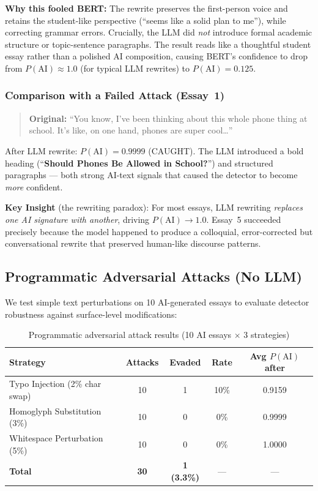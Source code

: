 \documentclass[11pt,a4paper]{article}
\begin{document}
\textbf{Why this fooled BERT:} The rewrite preserves the first-person voice and retains the student-like perspective (``seems like a solid plan to me''), while correcting grammar errors. Crucially, the LLM did \emph{not} introduce formal academic structure or topic-sentence paragraphs. The result reads like a thoughtful student essay rather than a polished AI composition, causing BERT's confidence to drop from $P(\text{AI})\approx1.0$ (for typical LLM rewrites) to $P(\text{AI})=0.125$.

\subsubsection*{Comparison with a Failed Attack (Essay~1)}

\begin{quote}
\textbf{Original:} ``You know, I've been thinking about this whole phone thing at school. It's like, on one hand, phones are super cool\ldots''
\end{quote}

After LLM rewrite: $P(\text{AI})=0.9999$ (CAUGHT). The LLM introduced a bold heading (``\textbf{Should Phones Be Allowed in School?}'') and structured paragraphs — both strong AI-text signals that caused the detector to become \emph{more} confident.

\textbf{Key Insight} (the rewriting paradox): For most essays, LLM rewriting \emph{replaces one AI signature with another}, driving $P(\text{AI})\to1.0$. Essay~5 succeeded precisely because the model happened to produce a colloquial, error-corrected but conversational rewrite that preserved human-like discourse patterns.

\subsection{Programmatic Adversarial Attacks (No LLM)}

We test simple text perturbations on 10 AI-generated essays to evaluate detector robustness against surface-level modifications:

\begin{table}[H]
\centering
\caption{Programmatic adversarial attack results (10 AI essays $\times$ 3 strategies)}
\label{tab:programmatic}
\begin{tabular}{lcccc}
\toprule
\textbf{Strategy} & \textbf{Attacks} & \textbf{Evaded} & \textbf{Rate} & \textbf{Avg $P(\text{AI})$ after} \\
\midrule
Typo Injection (2\% char swap)    & 10 & 1 & 10\% & 0.9159 \\
Homoglyph Substitution (3\%)     & 10 & 0 & 0\%  & 0.9999 \\
Whitespace Perturbation (5\%)    & 10 & 0 & 0\%  & 1.0000 \\
\midrule
\textbf{Total} & \textbf{30} & \textbf{1 (3.3\%)} & --- & --- \\
\bottomrule
\end{tabular}
\end{table}
\end{document}
